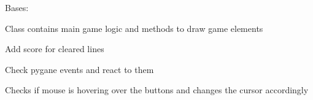 \documentclass[letterpaper,10pt,english]{sphinxmanual}
\begin{document}
\begin{fulllineitems}
\label{\detokenize{tetris.game:tetris.game.Game}}
\pysigstartsignatures
{}
\pysigstopsignatures
\sphinxAtStartPar
Bases: 

\sphinxAtStartPar
Class contains main game logic and methods to draw game elements

\begin{fulllineitems}
\label{\detokenize{tetris.game:tetris.game.Game.add_score}}
\pysigstartsignatures
{}
\pysigstopsignatures
\sphinxAtStartPar
Add score for cleared lines

\end{fulllineitems}


\begin{fulllineitems}
\label{\detokenize{tetris.game:tetris.game.Game.check_events}}
\pysigstartsignatures
{}
\pysigstopsignatures
\sphinxAtStartPar
Check pygane events and react to them

\end{fulllineitems}


\begin{fulllineitems}
\label{\detokenize{tetris.game:tetris.game.Game.check_hover}}
\pysigstartsignatures
{}
\pysigstopsignatures
\sphinxAtStartPar
Checks if mouse is hovering over the buttons and changes the cursor accordingly

\end{fulllineitems}


\end{fulllineitems}
\end{document}
